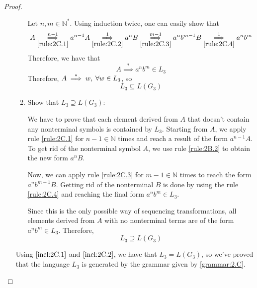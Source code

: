 \documentclass[11pt]{article}
\begin{document}
\begin{proof}
\begin{enumerate}
\begin{enumerate}
            Let $n, m \in \mathbb{N}^*$. Using induction twice, one can easily show that 
            \[
                A \overset{n - 1}{\underset{\eqref{rule:2C.1}}{\implies}} a^{n - 1}A
                \overset{1}{\underset{\eqref{rule:2C.2}}{\implies}} a^nB
                \overset{m - 1}{\underset{\eqref{rule:2C.3}}{\implies}} a^nb^{m - 1}B
                \overset{1}{\underset{\eqref{rule:2C.4}}{\implies}} a^nb^m
            \] 
            Therefore, we have that
            \begin{equation}
                A \overset{*}{\implies} a^nb^m \in L_3
            \end{equation}
            Therefore, $A \overset{*}{\implies} w, \hspace{0.25em} \forall w \in L_3$, so
            \begin{equation}\label{incl:2C.1}
                L_3 \subseteq L(G_3)
            \end{equation}

            \vspace{1em}

            \item Show that $L_3 \supseteq L(G_3)$:

            We have to prove that each element derived from $A$ that doesn't contain
            any nonterminal symbols is contained by $L_3$. Starting from $A$, we apply
            rule \eqref{rule:2C.1} for $n - 1 \in \mathbb{N}$ times and reach a result
            of the form $a^{n-1}A$. To get rid of the nonterminal symbol $A$, we use
            rule \eqref{rule:2B.2} to obtain the new form $a^nB$.

            Now, we can apply rule \eqref{rule:2C.3} for $m - 1 \in \mathbb{N}$ times
            to reach the form  $a^nb^{m - 1}B$. Getting rid of the nonterminal $B$ 
            is done by using the rule \eqref{rule:2C.4} and reaching the final form
            $a^nb^m \in L_3$.

            Since this is the only possible way of sequencing transformations, 
            all elements derived from $A$ with no nonterminal terms are of the 
            form $a^nb^{m} \in L_3$. Therefore, 
            \begin{equation}\label{incl:2C.2}
                L_3 \supseteq L(G_3) 
            \end{equation}
        \end{enumerate}
        Using $\eqref{incl:2C.1}$ and $\eqref{incl:2C.2}$, we have that $L_3 = L(G_3)$, so
        we've proved that the language $L_3$ is generated by the grammar given by \eqref{grammar:2.C}.


\end{enumerate}
\end{proof}
\end{document}
